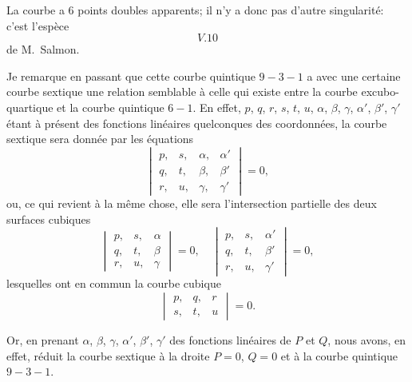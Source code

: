 \documentclass[11pt,a4paper]{article}
\begin{document}
La courbe a 6 points doubles apparents; il n'y a donc pas d'autre singularit\'{e}: c'est l'esp\`{e}ce
\[
V.10
\]
de M.~Salmon.

Je remarque en passant que cette courbe quintique $9 - 3 - 1$ a avec une certaine courbe sextique une relation semblable \`{a} celle qui existe entre la courbe excubo-quartique et la courbe quintique $6 - 1$. En effet, $p$, $q$, $r$, $s$, $t$, $u$, $\alpha$, $\beta$, $\gamma$, $\alpha'$, $\beta'$, $\gamma'$ \'{e}tant \`{a} pr\'{e}sent des fonctions lin\'{e}aires quelconques des coordonn\'{e}es, la courbe sextique sera donn\'{e}e par les \'{e}quations
\[
\begin{vmatrix}
p, & s, & \alpha, & \alpha' \\
q, & t, & \beta, & \beta' \\
r, & u, & \gamma, & \gamma'
\end{vmatrix} = 0,
\]
ou, ce qui revient \`{a} la m\^{e}me chose, elle sera l'intersection partielle des deux surfaces cubiques
\[
\begin{vmatrix}
p, & s, & \alpha \\
q, & t, & \beta \\
r, & u, & \gamma
\end{vmatrix} = 0,
\quad
\begin{vmatrix}
p, & s, & \alpha' \\
q, & t, & \beta' \\
r, & u, & \gamma'
\end{vmatrix} = 0,
\]
lesquelles ont en commun la courbe cubique
\[
\begin{vmatrix}
p, & q, & r \\
s, & t, & u
\end{vmatrix} = 0.
\]

\clearpage

Or, en prenant $\alpha$, $\beta$, $\gamma$, $\alpha'$, $\beta'$, $\gamma'$ des fonctions lin\'{e}aires de $P$ et $Q$, nous avons, en effet, r\'{e}duit la courbe sextique \`{a} la droite $P = 0$, $Q = 0$ et \`{a} la courbe quintique $9 - 3 - 1$.
\end{document}
